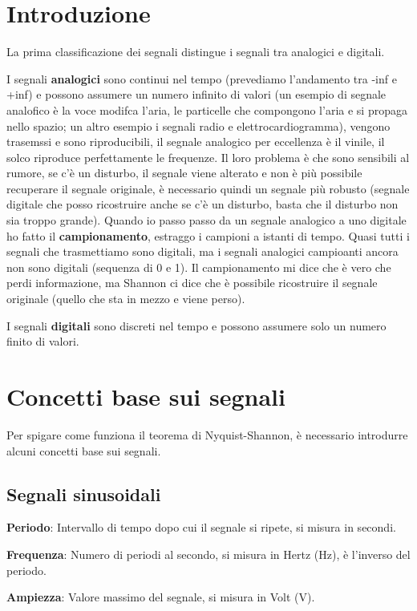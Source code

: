 \section{Introduzione}
La prima classificazione dei segnali distingue i segnali tra analogici e digitali. 

I segnali \textbf{analogici} sono continui nel tempo (prevediamo l'andamento tra -inf e +inf) 
e possono assumere un numero infinito di valori (un esempio di segnale analofico è la voce
modifca l'aria, le particelle che compongono l'aria e si propaga nello spazio; un altro esempio 
i segnali radio e elettrocardiogramma), vengono trasemssi e sono riproducibili, il segnale 
analogico per eccellenza è il vinile, il solco riproduce perfettamente le frequenze.
Il loro problema è che sono sensibili al rumore, se c'è un disturbo, il segnale viene
alterato e non è più possibile recuperare il segnale originale, è necessario quindi un 
segnale più robusto (segnale digitale che posso ricostruire anche se c'è un disturbo, 
basta che il disturbo non sia troppo grande).
Quando io passo passo da un segnale analogico a uno digitale ho fatto il
\textbf{campionamento}, estraggo i campioni a istanti di tempo.
Quasi tutti i segnali che trasmettiamo sono digitali, ma i segnali analogici campioanti
ancora non sono digitali (sequenza di 0 e 1).
Il campionamento mi dice che è vero che perdi informazione, ma Shannon ci dice che è 
possibile ricostruire il segnale originale (quello che sta in mezzo e viene perso).

I segnali \textbf{digitali} sono discreti nel tempo e possono assumere solo un numero 
finito di valori.

\section{Concetti base sui segnali}

Per spigare come funziona il teorema di Nyquist-Shannon, è necessario introdurre alcuni
concetti base sui segnali.
\subsection{Segnali sinusoidali}

\textbf{Periodo}: Intervallo di tempo dopo cui il segnale si ripete, si misura in secondi.

\textbf{Frequenza}: Numero di periodi al secondo, si misura in Hertz (Hz), è l'inverso del periodo.

\textbf{Ampiezza}: Valore massimo del segnale, si misura in Volt (V).

